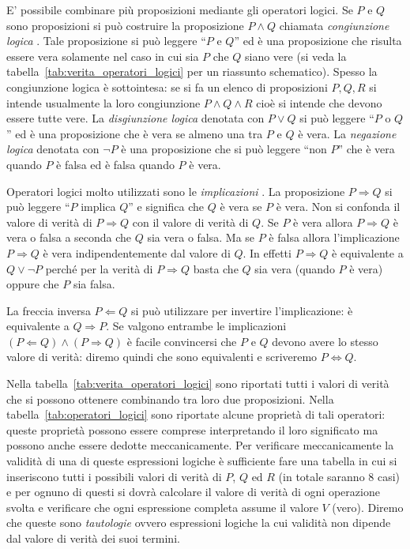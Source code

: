 E' possibile combinare più proposizioni mediante
gli operatori logici. Se $P$ e $Q$ sono proposizioni
si può costruire la proposizione $P \land Q$
chiamata \emph{congiunzione logica}%
%
.
Tale proposizione
si può leggere ``$P$ e $Q$'' ed è una proposizione
che risulta essere vera solamente nel caso in cui sia
$P$ che $Q$ siano vere
(si veda la tabella~\ref{tab:verita_operatori_logici}
per un riassunto schematico).
Spesso la congiunzione logica è sottointesa:
se si fa un elenco di proposizioni $P,Q,R$ 
si intende usualmente la loro congiunzione $P \land Q \land R$
cioè si intende che devono essere tutte vere.
La \emph{disgiunzione logica}%
%
 denotata
con $P \lor Q$
si può leggere ``$P$ o $Q$'' ed è una proposizione che
è vera se almeno una tra $P$ e $Q$ è vera.
La \emph{negazione logica}%
%
 denotata con $\lnot P$ è una
proposizione che si può leggere ``non $P$'' che
è vera quando $P$ è falsa ed è falsa quando $P$ è vera.

Operatori logici molto utilizzati sono le \emph{implicazioni}%
%
.
La proposizione $P\Rightarrow Q$ si può leggere ``$P$ implica $Q$''
e significa che $Q$ è vera se $P$ è vera. Non si confonda
il valore di verità di $P\Rightarrow Q$ con il valore di verità
di $Q$. Se $P$ è vera allora $P\Rightarrow Q$ è vera o falsa
a seconda che $Q$ sia vera o falsa. Ma se $P$ è falsa allora
l'implicazione $P\Rightarrow Q$ è vera indipendentemente dal
valore di $Q$. In effetti $P\Rightarrow Q$ è equivalente a
$Q \lor \lnot P$ perché per la verità di $P\Rightarrow Q$
basta che $Q$ sia vera (quando $P$ è vera) oppure che $P$ sia falsa.

La freccia inversa $P\Leftarrow Q$ si può utilizzare per
invertire l'implicazione: è equivalente a $Q \Rightarrow P$.
Se valgono entrambe le implicazioni
$(P \Leftarrow Q) \land (P\Rightarrow Q)$
è facile convincersi che $P$ e $Q$ devono avere lo stesso
valore di verità: diremo quindi che sono equivalenti e
scriveremo $P \Leftrightarrow Q$.

Nella tabella~\ref{tab:verita_operatori_logici} sono riportati
tutti i valori di verità che si possono ottenere combinando
tra loro due proposizioni. Nella tabella~\ref{tab:operatori_logici}
sono riportate alcune proprietà di tali operatori: queste
proprietà possono essere comprese interpretando il loro significato
ma possono anche essere dedotte meccanicamente. 
Per verificare meccanicamente la validità di una di queste 
espressioni logiche è sufficiente fare una tabella in cui si 
inseriscono tutti i possibili valori di verità di $P$, $Q$ ed $R$
(in totale saranno $8$ casi) e per ognuno di questi si dovrà
calcolare il valore di verità di ogni operazione svolta e verificare 
che ogni espressione completa assume il valore $V$ (vero).
Diremo che queste sono \emph{tautologie}
%
%
ovvero espressioni logiche la cui validità non dipende
dal valore di verità dei suoi termini.

